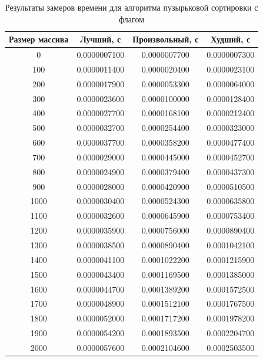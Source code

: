 \documentclass[a4paper,14pt]{report}
\begin{document}
\begin{table}[!h]
	\caption{Результаты замеров времени для алгоритма пузырьковой сортировки с флагом}
		\begin{tabular}{| c | c | c | c |}
	 	\hline
		Размер массива & Лучший, с & Произвольный, с & Худший, с \\ [0.5ex]
		\hline
		0 & 0.0000007100 & 0.0000007700 & 0.0000007300 \\
		\hline
		100 & 0.0000011400 & 0.0000020400 & 0.0000023100 \\
		\hline
		200 & 0.0000017900 & 0.0000053300 & 0.0000064000 \\
		\hline
		300 & 0.0000023600 & 0.0000100000 & 0.0000128400 \\
		\hline
		400 & 0.0000027700 & 0.0000168100 & 0.0000212400 \\
		\hline
		500 & 0.0000032700 & 0.0000254400 & 0.0000323000 \\
		\hline
		600 & 0.0000037700 & 0.0000358200 & 0.0000477400 \\
		\hline
		700 & 0.0000029000 & 0.0000445000 & 0.0000452700 \\
		\hline
		800 & 0.0000024900 & 0.0000379400 & 0.0000437300 \\
		\hline
		900 & 0.0000028000 & 0.0000420900 & 0.0000510500 \\
		\hline
		1000 & 0.0000030400 & 0.0000524300 & 0.0000635800 \\
		\hline
		1100 & 0.0000032600 & 0.0000645900 & 0.0000753400 \\
		\hline
		1200 & 0.0000035900 & 0.0000756000 & 0.0000890400 \\
		\hline
		1300 & 0.0000038500 & 0.0000890400 & 0.0001042100 \\
		\hline
		1400 & 0.0000041100 & 0.0001022200 & 0.0001215900 \\
		\hline
		1500 & 0.0000043400 & 0.0001169500 & 0.0001385000 \\
		\hline
		1600 & 0.0000044700 & 0.0001389200 & 0.0001572500 \\
		\hline
		1700 & 0.0000048900 & 0.0001512100 & 0.0001767500 \\
		\hline
		1800 & 0.0000052000 & 0.0001717200 & 0.0001978200 \\
		\hline
		1900 & 0.0000054200 & 0.0001893500 & 0.0002204700 \\
		\hline
		2000 & 0.0000057600 & 0.0002104600 & 0.0002503500 \\
		\hline
		\end{tabular}
\end{table}
\end{document}
